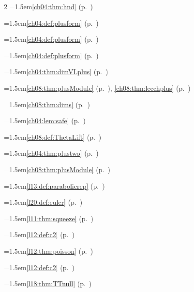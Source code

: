\begin{multicols}{2}
\hangindent=1.5em\quad \ref{ch04:thm:hnd} (p.~\pageref{ch04:thm:hnd})\par
\hangindent=1.5em\quad \ref{ch04:def:plusform} (p.~\pageref{ch04:def:plusform})\par
\hangindent=1.5em\quad \ref{ch04:def:plusform} (p.~\pageref{ch04:def:plusform})\par
\hangindent=1.5em\quad \ref{ch04:def:plusform} (p.~\pageref{ch04:def:plusform})\par
\hangindent=1.5em\quad \ref{ch04:thm:dimVLplus} (p.~\pageref{ch04:thm:dimVLplus})\par
\hangindent=1.5em\quad \ref{ch08:thm:plusModule} (p.~\pageref{ch08:thm:plusModule}), \ref{ch08:thm:leechplus} (p.~\pageref{ch08:thm:leechplus})\par
\hangindent=1.5em\quad \ref{ch08:thm:dims} (p.~\pageref{ch08:thm:dims})\par
\hangindent=1.5em\quad \ref{ch04:lem:safe} (p.~\pageref{ch04:lem:safe})\par
\hangindent=1.5em\quad \ref{ch08:def:ThetaLift} (p.~\pageref{ch08:def:ThetaLift})\par
\hangindent=1.5em\quad \ref{ch04:thm:plustwo} (p.~\pageref{ch04:thm:plustwo})\par
\hangindent=1.5em\quad \ref{ch08:thm:plusModule} (p.~\pageref{ch08:thm:plusModule})\par
\hangindent=1.5em\quad \ref{l13:def:parabolicrep} (p.~\pageref{l13:def:parabolicrep})\par
\hangindent=1.5em\quad \ref{l20:def:euler} (p.~\pageref{l20:def:euler})\par
\hangindent=1.5em\quad \ref{l11:thm:squeeze} (p.~\pageref{l11:thm:squeeze})\par
\hangindent=1.5em\quad \ref{l12:def:c2} (p.~\pageref{l12:def:c2})\par
\hangindent=1.5em\quad \ref{l12:thm:poisson} (p.~\pageref{l12:thm:poisson})\par
\hangindent=1.5em\quad \ref{l12:def:c2} (p.~\pageref{l12:def:c2})\par
\hangindent=1.5em\quad \ref{l18:thm:TTnull} (p.~\pageref{l18:thm:TTnull})\par

\end{multicols}
